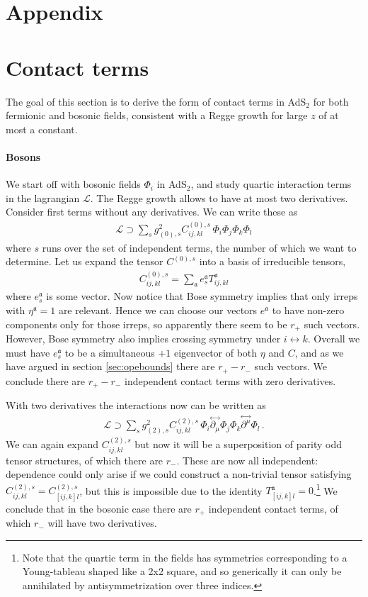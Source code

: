 \documentclass[12pt]{article}
\numberwithin{equation}{section}
\newcommand{\bea}{\begin{eqnarray}}
\newcommand{\eea}{\end{eqnarray}}
\newcommand{\ba}{\begin{equation}\begin{aligned}}
\newcommand{\ea}{\end{aligned}\end{equation}}
\newcommand{\mf}[1]{\mathfrak #1}
\begin{document}
	\appendix
	
	
	
	\section*{Appendix}
	
	\section{Contact terms}
	\label{app:contact}
	The goal of this section is to derive the form of contact terms in AdS$_2$ for both fermionic and bosonic fields, consistent with a Regge growth for large $z$ of at most a constant.
	
	\paragraph{Bosons}
	We start off with bosonic fields $\Phi_i$ in AdS$_2$, and study quartic interaction terms in the lagrangian $\mathcal L$. The Regge growth allows to have at most two derivatives. Consider first terms without any derivatives. We can write these as
	\ba
	\mathcal L \supset \sum_s g^2_{(0),s}   C^{(0),s}_{ij,kl} \, \Phi_i \Phi_j \Phi_k \Phi_l
	\ea
	where $s$ runs over the set of independent terms, the number of which we want to determine.
	Let us expand the tensor $C^{(0),s}$ into a basis of irreducible tensors,
	\ba
	C^{(0),s}_{ij,kl}=\sum_{\mf a} e^{\mf a}_s T^{\mf a}_{ij,kl}
	\ea
	where $e^{\mf a}_s$ is some vector. Now notice that Bose symmetry implies that only irreps with $\eta^{\mf a}=1$ are relevant. Hence we can choose our vectors $e^{\mf a}$ to have non-zero components only for those irreps, so apparently there seem to be $r_+$ such vectors. However, Bose symmetry also implies crossing symmetry under $i\leftrightarrow k$. Overall we must have $e^{\mf a}_s$ to be a simultaneous $+1$ eigenvector of both $\eta$ and $C$, and as we have argued in section \ref{sec:opebounds} there are $r_+-r_-$ such vectors. We conclude there are $r_+-r_-$ independent contact terms with zero derivatives.
	
	With two derivatives the interactions now can be written as
	\bea
	\mathcal L\supset \sum_s g^2_{(2),s}   C^{(2),s}_{ij,kl}\, \Phi_i \overset{\leftrightarrow}{\partial_\mu} \Phi_j \Phi_k \overset{\leftrightarrow}{\partial^\mu}\Phi_l\,.
	\eea
	We can again expand $ C^{(2),s}_{ij,kl}$ but now it will be a superposition of parity odd tensor structures, of which there are $r_-$. These are now all independent: dependence could only arise if we could construct a non-trivial tensor satisfying $C^{(2),s}_{ij,kl}=C^{(2),s}_{[ij,k]l}$, but this is impossible due to the identity $T^{\mf a}_{[ij,k]l}=0$.\footnote{Note that the quartic term in the fields has symmetries corresponding to a Young-tableau shaped like a 2x2 square, and so generically it can only be annihilated by antisymmetrization over three indices.} We conclude that in the bosonic case there are $r_+$ independent contact terms, of which $r_-$ will have two derivatives.
	
\end{document}
